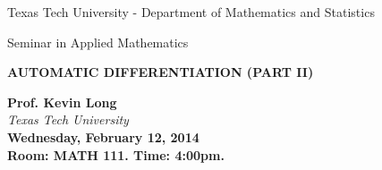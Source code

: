 \documentclass[oneside]{article}
\newcommand{\talktitle}{Automatic Differentiation (part II)}
\newcommand{\talkspeaker}{ \textbf{\sc Prof. Kevin Long}\\ \textit{Texas Tech University}}
\newcommand{\talkdate}{\textbf{Wednesday, February 12, 2014}}
\newcommand{\timelocation}{\textbf{Room: MATH 111.  Time: 4:00pm.}}
\newcommand{\talkabstract}{
Abstract of the talk
}
\begin{document}

\vspace*{-2cm}
\begin{center}
{\LARGE Texas Tech University - Department of Mathematics and Statistics }

\vspace{0.2cm}
{\LARGE Seminar in Applied Mathematics }


\medskip

\vspace{1cm}

\textbf{\Huge {\uppercase{\talktitle}} }

\vspace{1cm}

{\LARGE
\talkspeaker\\
\talkdate\\
\timelocation
}

\vspace*{10pt}

\end{center}



% 
% 
% 
% 
% 
\end{document}
